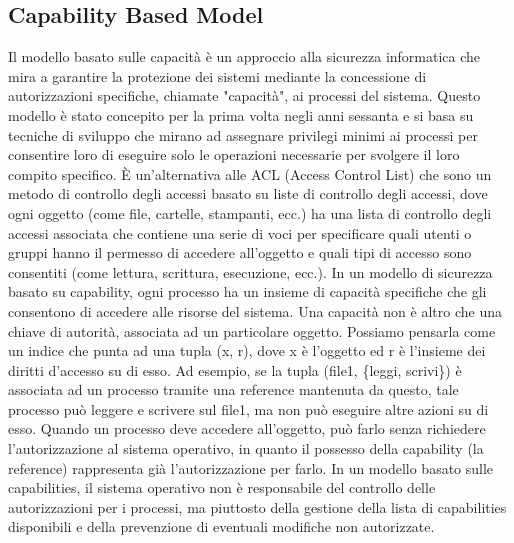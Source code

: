 

\subsection{Capability Based Model}
Il modello basato sulle capacità è un approccio alla sicurezza informatica che mira a garantire la protezione dei
sistemi mediante la concessione di autorizzazioni specifiche, chiamate "capacità", ai processi del sistema. Questo
modello è stato concepito per la prima volta negli anni sessanta\cite{capability-based-security} e si basa su tecniche
di sviluppo che mirano ad assegnare privilegi minimi\cite{Saltzer1975ThePO} ai processi per consentire loro di eseguire
solo le operazioni necessarie per svolgere il loro compito specifico. È un'alternativa alle ACL (Access Control
List)\cite{samarati2001access} che sono un metodo di controllo degli accessi basato su liste di controllo degli accessi,
dove ogni oggetto (come file, cartelle, stampanti, ecc.) ha una lista di controllo degli accessi associata che contiene
una serie di voci per specificare quali utenti o gruppi hanno il permesso di accedere all'oggetto e quali tipi di
accesso sono consentiti (come lettura, scrittura, esecuzione, ecc.). In un modello di sicurezza basato su capability,
ogni processo ha un insieme di capacità specifiche che gli consentono di accedere alle risorse del sistema. Una capacità
non è altro che una chiave di autorità, associata ad un particolare oggetto. Possiamo pensarla come un indice che punta
ad una tupla\cite{wasm-capability-tuple} (x, r), dove x è l'oggetto ed r è l'insieme dei diritti d'accesso su di esso.
Ad esempio, se la tupla (file1, \{leggi, scrivi\}) è associata ad un processo tramite una reference mantenuta da questo,
tale processo può leggere e scrivere sul file1, ma non può eseguire altre azioni su di esso. Quando un processo deve
accedere all'oggetto, può farlo senza richiedere l'autorizzazione al sistema operativo, in quanto il possesso della
capability (la reference) rappresenta già l'autorizzazione per farlo. In un modello basato sulle capabilities, il
sistema operativo non è responsabile del controllo delle autorizzazioni per i processi, ma piuttosto della gestione
della lista di capabilities disponibili e della prevenzione di eventuali modifiche non autorizzate.
